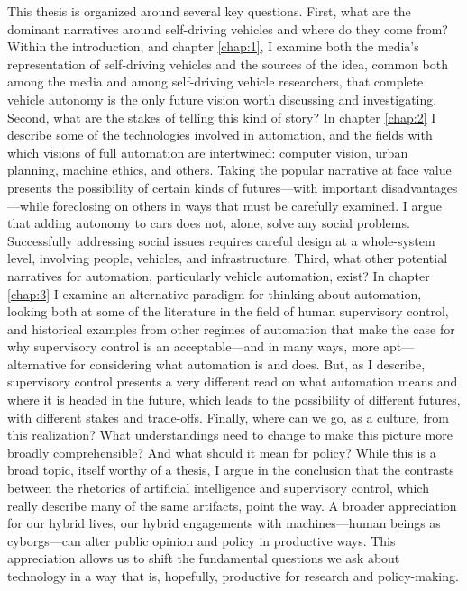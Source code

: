 This thesis is organized around several key questions. First, what are
the dominant narratives around self-driving vehicles and where do they
come from? Within the introduction, and chapter \ref{chap:1}, I
examine both the media's representation of self-driving vehicles and
the sources of the idea, common both among the media and among
self-driving vehicle researchers, that complete vehicle autonomy is
the only future vision worth discussing and investigating. Second,
what are the stakes of telling this kind of story? In chapter
\ref{chap:2} I describe some of the technologies involved in
automation, and the fields with which visions of full automation are
intertwined: computer vision, urban planning, machine ethics, and
others. Taking the popular narrative at face value presents the
possibility of certain kinds of futures---with important
disadvantages---while foreclosing on others in ways that must be
carefully examined. I argue that adding autonomy to cars does not,
alone, solve any social problems. Successfully addressing social
issues requires careful design at a whole-system level, involving
people, vehicles, and infrastructure. Third, what other potential
narratives for automation,
particularly vehicle automation, exist? In chapter \ref{chap:3} I
examine an alternative paradigm for thinking about automation, looking
both at some of the literature in the field of human supervisory
control, and historical examples from other regimes of automation that
make the case for why supervisory control is an acceptable---and in
many ways, more apt---alternative for considering what automation is
and does. But, as I describe, supervisory control presents a very
different read on what automation means and where it is headed in the
future, which leads to the possibility of different futures, with
different stakes and trade-offs. Finally, where can we go, as a
culture, from this realization? What understandings need to change to
make this picture more broadly comprehensible? And what should it mean
for policy? While this is a broad topic, itself worthy of a thesis, I
argue in the conclusion that the contrasts
between the rhetorics of artificial intelligence and supervisory
control, which really describe many of the same artifacts, point the
way. A broader appreciation for our hybrid lives, our hybrid
engagements with machines---human beings as cyborgs---can alter public
opinion and policy in
productive ways. This appreciation allows us to shift the fundamental
questions we ask about technology in a way that is, hopefully,
productive for research and policy-making.

